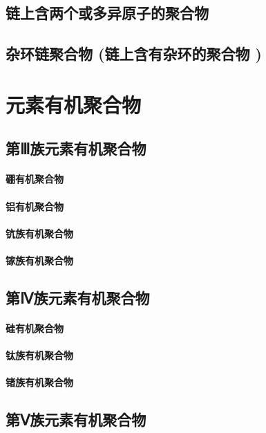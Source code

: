 \documentclass[UTF8]{../03-Chemistry}
\begin{document}
\section{链上含两个或多异原子的聚合物}
\section{杂环链聚合物 (链上含有杂环的聚合物 )}










\chapter{元素有机聚合物}
\section{第Ⅲ族元素有机聚合物}
    \subsubsection{硼有机聚合物}
    \subsubsection{铝有机聚合物}
    \subsubsection{钪族有机聚合物}
    \subsubsection{镓族有机聚合物}
\section{第Ⅳ族元素有机聚合物}
    \subsubsection{硅有机聚合物}
    \subsubsection{钛族有机聚合物}
    \subsubsection{锗族有机聚合物}
\section{第Ⅴ族元素有机聚合物}
\end{document}

